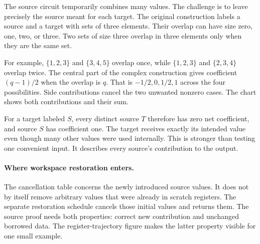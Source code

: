 
The source circuit temporarily combines many values. The challenge is to
leave precisely the source meant for each target. The original construction
labels a source and a target with sets of three elements. Their overlap can
have size zero, one, two, or three. Two sets of size three overlap in three
elements only when they are the same set.

For example, $\{1,2,3\}$ and $\{3,4,5\}$ overlap once, while
$\{1,2,3\}$ and $\{2,3,4\}$ overlap twice. The central part of
the complex construction gives coefficient $(q-1)/2$ when the overlap is $q$.
That is $-1/2,0,1/2,1$ across the four possibilities. Side contributions
cancel the two unwanted nonzero cases. The chart shows both contributions
and their sum.


For a target labeled $S$, every distinct source $T$ therefore has zero
net coefficient, and source $S$ has coefficient one. The target receives
exactly its intended value even though many other values were used internally.
This is stronger than testing one convenient input. It describes every
source's contribution to the output.

\paragraph{Where workspace restoration enters.}
The cancellation table concerns the newly introduced source values. It does
not by itself remove arbitrary values that were already in scratch registers.
The separate restoration schedule cancels those initial values and returns
them. The source proof needs both properties: correct new contribution and
unchanged borrowed data. The register-trajectory figure makes the latter
property visible for one small example.

